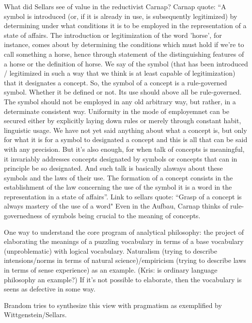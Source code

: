 What did Sellars see of value in the reductivist Carnap? Carnap quote: ``A symbol is introduced (or, if it is already in use, is subsequently legitimized) by determining under what conditions it is to be employed in the representation of a state of affairs. The introduction or legitimization of the word 'horse', for instance, comes about by determining the conditions which must hold if we're to call something a horse, hence through statement of the distinguishing features of a horse or the definition of horse. We say of the symbol (that has been introduced / legitimized in such a way that we think is at least capable of legitimization) that it designates a concept. So, the symbol of a concept is a rule-governed symbol. Whether it be defined or not. Its use should above all be rule-governed. The symbol should not be employed in any old arbitrary way, but rather, in a determinate consistent way. Uniformity in the mode of employemnet can be secured either by explicitly laying down rules or merely through constant habit, linguistic usage. We have not yet said anything about what a concept is, but only for what it is for a symbol to designated a concept and this is all that can be said with any precision. But it's also enough, for when talk of concepts is meaningful, it invariably addresses concepts designated by symbols or concepts that can in principle be so designated. And such talk is basically alaways about these symbols and the laws of their use. The formation of a concept consists in the establishment of the law concerning the use of the symbol it is a word in the representation in a state of affairs''. Link to sellars quote: ``Grasp of a concept is always mastery of the use of a word" Even in the Aufbau, Carnap thinks of rule-governedness of symbols being crucial to the meaning of concepts.

One way to understand the core program of analytical philosophy: the project of elaborating the meanings of a puzzling vocabulary in terms of a base vocabulary (unproblematic) with logical vocabulary. Naturalism (trying to describe intensions/norms in terms of natural science)/empiricism (trying to describe laws in terms of sense experience) as an example. (Kris: is ordinary language philosophy an example?) If it's not possible to elaborate, then the vocabulary is seens as defective in some way.

Brandom tries to synthesize this view with pragmatism as exemplified by Wittgenstein/Sellars.